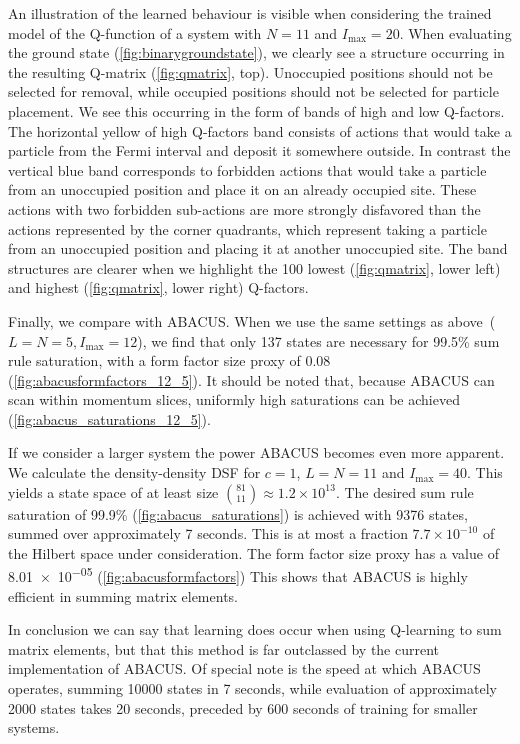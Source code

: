 \documentclass[11pt, a4paper]{report} %
\begin{document}
An illustration of the learned behaviour is visible when considering the trained model of the Q-function of a system with \(N=11\) and \(I_{\max}=20\).
When evaluating the ground state (\cref{fig:binarygroundstate}), we clearly see a structure occurring in the resulting Q-matrix (\cref{fig:qmatrix}, top).
Unoccupied positions should not be selected for removal, while occupied positions should not be selected for particle placement.
We see this occurring in the form of bands of high and low Q-factors.
The horizontal yellow of high Q-factors band consists of actions that would take a particle from the Fermi interval and deposit it somewhere outside.
In contrast the vertical blue band corresponds to forbidden actions that would take a particle from an unoccupied position and place it on an already occupied site.
These actions with two forbidden sub-actions are more strongly disfavored than the actions represented by the corner quadrants, which represent taking a particle from an unoccupied position and placing it at another unoccupied site.
The band structures are clearer when we highlight the 100 lowest (\cref{fig:qmatrix}, lower left) and highest (\cref{fig:qmatrix}, lower right) Q-factors.

\begin{sloppypar}
Finally, we compare with ABACUS.
When we use the same settings as above~(\(L=N=5, I_{\max}=12\)), we find that only 137 states are necessary for 99.5\% sum rule saturation, with a form factor size proxy of 0.08 (\cref{fig:abacusformfactors_12_5}).
It should be noted that, because ABACUS can scan within momentum slices, uniformly high saturations can be achieved (\cref{fig:abacus_saturations_12_5}).
\end{sloppypar}

If we consider a larger system the power ABACUS becomes even more apparent.
We calculate the density-density DSF for \(c=1\), \(L=N=11\) and \(I_{\max}=40\).
This yields a state space of at least size \(\binom{81}{11}\approx 1.2\times 10^{13}\).
The desired sum rule saturation of 99.9\% (\cref{fig:abacus_saturations}) is achieved with 9376 states, summed over approximately 7 seconds.
This is at most a fraction \(7.7\times 10^{-10}\) of the Hilbert space under consideration.
The form factor size proxy has a value of \num{8.01e-05} (\cref{fig:abacusformfactors})
This shows that ABACUS is highly efficient in summing matrix elements.

In conclusion we can say that learning does occur when using Q-learning to sum matrix elements, but that this method is far outclassed by the current implementation of ABACUS.
Of special note is the speed at which ABACUS operates, summing 10000 states in 7 seconds, while evaluation of approximately 2000 states takes 20 seconds, preceded by 600 seconds of training for smaller systems.
\end{document}
